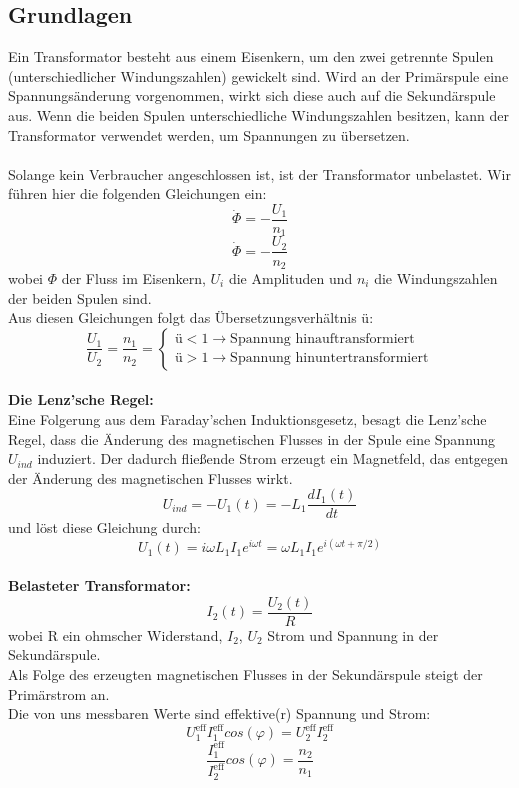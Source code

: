 \documentclass{article}
\begin{document}
\subsection{Grundlagen}
Ein Transformator besteht aus einem Eisenkern, um den zwei getrennte Spulen (unterschiedlicher Windungszahlen) gewickelt sind. Wird an der Primärspule eine Spannungsänderung vorgenommen, wirkt sich diese auch auf die Sekundärspule aus. Wenn die beiden Spulen unterschiedliche Windungszahlen besitzen, kann der Transformator verwendet werden, um Spannungen zu übersetzen.\\
\\
Solange kein Verbraucher angeschlossen ist, ist der Transformator unbelastet. Wir führen hier die folgenden Gleichungen ein: \\
$$\dot{\Phi}=-\frac{U_1}{n_1}$$
$$\dot{\Phi}=-\frac{U_2}{n_2}$$
wobei $\Phi$ der Fluss im Eisenkern, $U_i$ die Amplituden und $n_i$ die Windungszahlen der beiden Spulen sind. \\
Aus diesen Gleichungen folgt das Übersetzungsverhältnis ü:\\

\begin{equation}
\label{uebersetzungsverhaeltnis}
\frac{U_1}{U_2}=\frac{n_1}{n_2}=\begin{cases}\textrm{ü}<1 \rightarrow\textrm{Spannung hinauftransformiert}\\\textrm{ü}>1 \rightarrow\textrm{Spannung hinuntertransformiert}\end{cases}
\end{equation}
\\
\textbf{Die Lenz'sche Regel:}\\
Eine Folgerung aus dem Faraday'schen Induktionsgesetz, besagt die Lenz'sche Regel, dass die Änderung des magnetischen Flusses in der Spule eine Spannung $U_{ind}$ induziert. Der dadurch fließende Strom erzeugt ein Magnetfeld, das entgegen der Änderung des magnetischen Flusses wirkt.\\
\begin{equation}
\label{lenzsche regel}
U_{ind}=-U_1(t)=-L_1\frac{dI_1(t)}{dt}
\end{equation}
und löst diese Gleichung durch:
\begin{equation}
\label{primaerspannung}
U_1(t)=i\omega L_1 I_1 e^{i\omega t}=\omega L_1 I_1 e^{i(\omega t + \pi / 2)}
\end{equation}
\\


\textbf{Belasteter Transformator:}
\begin{equation}
\label{belastet}
I_2(t)=\frac{U_2(t)}{R}
\end{equation}
wobei R ein ohmscher Widerstand, $I_2$, $U_2$ Strom und Spannung in der Sekundärspule.\\
Als Folge des erzeugten magnetischen Flusses in der Sekundärspule steigt der Primärstrom an. \\
Die von uns messbaren Werte sind effektive(r) Spannung und Strom:
$$U_1^{\textrm{eff}}I_1^{\textrm{eff}}cos(\varphi)=U_2^{\textrm{eff}}I_2^{\textrm{eff}}$$
$$\frac{I_1^{\textrm{eff}}}{I_2^{\textrm{eff}}}cos(\varphi)=\frac{n_2}{n_1}$$
\end{document}
